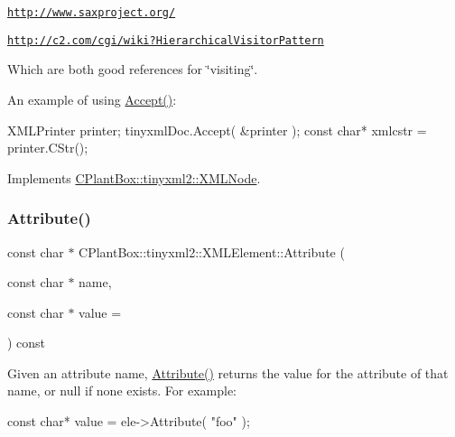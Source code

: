 \begin{DoxyItemize}
\item \href{http://www.saxproject.org/}{\tt http\+://www.\+saxproject.\+org/}
\item \href{http://c2.com/cgi/wiki?HierarchicalVisitorPattern}{\tt http\+://c2.\+com/cgi/wiki?\+Hierarchical\+Visitor\+Pattern}
\end{DoxyItemize}

Which are both good references for \char`\"{}visiting\char`\"{}.

An example of using \hyperlink{classCPlantBox_1_1tinyxml2_1_1XMLElement_a1dd18a30230bb93e53c2676bd9edb1ae}{Accept()}\+: \begin{DoxyVerb}XMLPrinter printer;
tinyxmlDoc.Accept( &printer );
const char* xmlcstr = printer.CStr();
\end{DoxyVerb}
 

Implements \hyperlink{classCPlantBox_1_1tinyxml2_1_1XMLNode_a2cdc6f044bd1f971e211328e42a4f9d5}{C\+Plant\+Box\+::tinyxml2\+::\+X\+M\+L\+Node}.

\mbox{\label{classCPlantBox_1_1tinyxml2_1_1XMLElement_a067223f76bebc06861d44386511d4ce8}} 
\subsubsection{\texorpdfstring{Attribute()}{Attribute()}}
{\footnotesize\ttfamily const char $\ast$ C\+Plant\+Box\+::tinyxml2\+::\+X\+M\+L\+Element\+::\+Attribute (\begin{DoxyParamCaption}\item[{const char $\ast$}]{name,  }\item[{const char $\ast$}]{value = {} }\end{DoxyParamCaption}) const}

Given an attribute name, \hyperlink{classCPlantBox_1_1tinyxml2_1_1XMLElement_a067223f76bebc06861d44386511d4ce8}{Attribute()} returns the value for the attribute of that name, or null if none exists. For example\+:

\begin{DoxyVerb}const char* value = ele->Attribute( "foo" );
\end{DoxyVerb}


